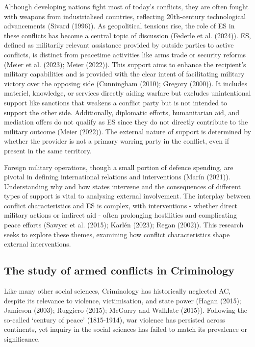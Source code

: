 \documentclass[
]{article}
\begin{document}
Although developing nations fight most of today's conflicts, they are
often fought with weapons from industrialised countries, reflecting
20th-century technological advancements (Sivard (1996)). As geopolitical
tensions rise, the role of ES in these conflicts has become a central
topic of discussion (Federle et al. (2024)). ES, defined as militarily
relevant assistance provided by outside parties to active conflicts, is
distinct from peacetime activities like arms trade or security reforms
(Meier et al. (2023); Meier (2022)). This support aims to enhance the
recipient's military capabilities and is provided with the clear intent
of facilitating military victory over the opposing side (Cunningham
(2010); Gregory (2000)). It includes materiel, knowledge, or services
directly aiding warfare but excludes unintentional support like
sanctions that weakens a conflict party but is not intended to support
the other side. Additionally, diplomatic efforts, humanitarian aid, and
mediation offers do not qualify as ES since they do not directly
contribute to the military outcome (Meier (2022)). The external nature
of support is determined by whether the provider is not a primary
warring party in the conflict, even if present in the same territory.

Foreign military operations, though a small portion of defence spending,
are pivotal in defining international relations and interventions (Marín
(2021)). Understanding why and how states intervene and the consequences
of different types of support is vital to analysing external
involvement. The interplay between conflict characteristics and ES is
complex, with interventions - whether direct military actions or
indirect aid - often prolonging hostilities and complicating peace
efforts (Sawyer et al. (2015); Karlén (2023); Regan (2002)). This
research seeks to explore these themes, examining how conflict
characteristics shape external interventions.

\subsection{The study of armed conflicts in
Criminology}\label{the-study-of-armed-conflicts-in-criminology}

Like many other social sciences, Criminology has historically neglected
AC, despite its relevance to violence, victimisation, and state power
(Hagan (2015); Jamieson (2003); Ruggiero (2015); McGarry and Walklate
(2015)). Following the so-called `century of peace' (1815-1914), war
violence has persisted across continents, yet inquiry in the social
sciences has failed to match its prevalence or significance.
\end{document}
